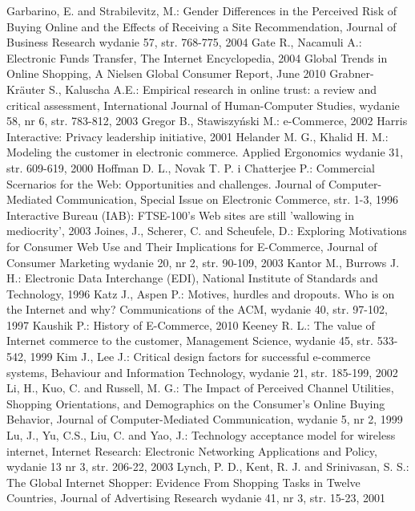 {\begin{thebibliography}{40}
     Garbarino, E. and Strabilevitz, M.: Gender Differences in the Perceived Risk of Buying Online and the Effects of Receiving a Site Recommendation, Journal of Business Research wydanie 57, str. 768-775, 2004
     Gate R., Nacamuli A.: Electronic Funds Transfer, The Internet Encyclopedia, 2004 
     Global Trends in Online Shopping, A Nielsen Global Consumer Report, June 2010
     Grabner-Kräuter S., Kaluscha A.E.: Empirical research in online trust: a review and critical assessment, International Journal of Human-Computer Studies, wydanie 58, nr 6, str. 783-812, 2003
     Gregor B., Stawiszyński M.: e-Commerce, 2002
     Harris Interactive: Privacy leadership initiative, 2001
     Helander M. G., Khalid H. M.: Modeling the customer in electronic commerce. Applied Ergonomics wydanie 31, str. 609-619, 2000
     Hoffman D. L., Novak T. P. i Chatterjee P.: Commercial Scernarios for the Web: Opportunities and challenges. Journal of Computer-Mediated Communication, Special Issue on Electronic Commerce, str. 1-3, 1996
     Interactive Bureau (IAB): FTSE-100's Web sites are still 'wallowing in mediocrity', 2003
     Joines, J., Scherer, C. and Scheufele, D.: Exploring Motivations for Consumer Web Use and Their Implications for E-Commerce, Journal of Consumer Marketing wydanie 20, nr 2, str. 90-109, 2003
     Kantor M., Burrows J. H.: Electronic Data Interchange (EDI), National Institute of Standards and Technology, 1996
     Katz J., Aspen P.: Motives, hurdles and dropouts. Who is on the Internet and why? Communications of the ACM, wydanie 40, str. 97-102, 1997
     Kaushik P.: History of E-Commerce, 2010
     Keeney R. L.: The value of Internet commerce to the customer, Management Science, wydanie 45, str. 533-542, 1999
     Kim J., Lee J.: Critical design factors for successful e-commerce systems, Behaviour and Information Technology, wydanie 21, str. 185-199, 2002
     Li, H., Kuo, C. and Russell, M. G.: The Impact of Perceived Channel Utilities, Shopping Orientations, and Demographics on the Consumer's Online Buying Behavior, Journal of Computer-Mediated Communication, wydanie 5, nr 2, 1999
     Lu, J., Yu, C.S., Liu, C. and Yao, J.: Technology acceptance model for wireless internet, Internet Research: Electronic Networking Applications and Policy, wydanie 13 nr 3, str. 206-22, 2003
     Lynch, P. D., Kent, R. J. and Srinivasan, S. S.: The Global Internet Shopper: Evidence From Shopping Tasks in Twelve Countries, Journal of Advertising Research wydanie 41, nr 3, str. 15-23, 2001

\end{thebibliography}}
